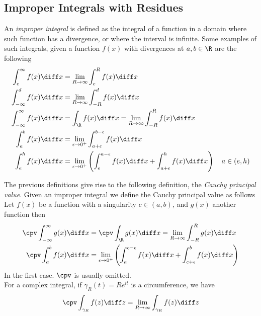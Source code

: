 \documentclass[../mmf.tex]{subfiles}
\begin{document}
\subsection{Improper Integrals with Residues}
\begin{dfn}
	An \textit{improper integral} is defined as the integral of a function in a domain where such function has a divergence, or where the interval is infinite.
	Some examples of such integrals, given a function $f(x)$ with divergences at $a,b\in\R$ are the following
	\begin{equation*}
		\begin{aligned}
			\int_{c}^{\infty}f(x)\diff x&=\lim_{R\to\infty}\int_{c}^{R}f(x)\diff x\\
			\int_{-\infty}^{d}f(x)\diff x&=\lim_{R\to\infty}\int_{-R}^{d}f(x)\diff x\\
			\int_{-\infty}^{\infty}f(x)\diff x&=\int_{\R}^{}f(x)\diff x=\lim_{R\to\infty}\int_{-R}^{R}f(x)\diff x\\
			\int_{a}^{b}f(x)\diff x&=\lim_{\epsilon\to0^+}\int_{a+\epsilon}^{b-\epsilon}f(x)\diff x\\
			\int_{e}^h f(x)\diff x&=\lim_{\epsilon\to0^+}\left( \int_{e}^{a-\epsilon}f(x)\diff x+\int_{a+\epsilon}^{h}f(x)\diff x \right)\quad a\in(e,h)
		\end{aligned}
	\end{equation*}
\end{dfn}
\begin{dfn}
	The previous definitions give rise to the following definition, the \textit{Cauchy principal value}. Given an improper integral we define the Cauchy principal value as follows\\
	Let $f(x)$ be a function with a singularity $c\in(a,b)$, and $g(x)$ another function then
	\begin{equation*}
		\begin{aligned}
			\cpv\int_{-\infty}^{\infty}g(x)\diff x&=\cpv\int_{\R}^{}g(x)\diff x=\lim_{R\to\infty}\int_{-R}^{R}g(x)\diff x\\
			\cpv\int_{a}^{b}f(x)\diff x&=\lim_{\epsilon\to0^+}\left(\int_{a}^{c-\epsilon}f(x)\diff x+\int_{c+\epsilon}^{b}f(x)\diff x\right)
		\end{aligned}
	\end{equation*}
	In the first case. $\cpv$ is usually omitted.\\
	For a complex integral, if $\gamma_R(t)=Re^{it}$ is a circumference, we have
	\begin{equation*}
		\cpv\int_{\gamma_R}^{}f(z)\diff z=\lim_{R\to\infty}\int_{\gamma_R}f(z)\diff z
	\end{equation*}
\end{dfn}
\end{document}
